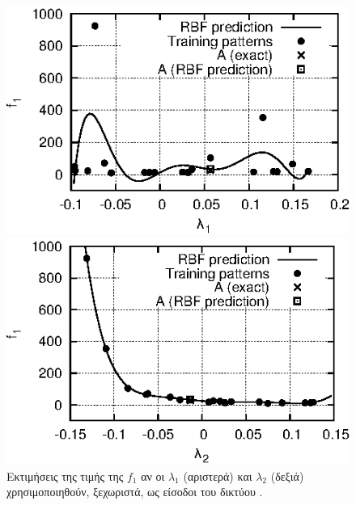 \begin{figure}
\begin{minipage}{0.48\textwidth}
\includegraphics[scale=1.2]{IPE/f1_e1_b.eps}
\end{minipage}
\begin{minipage}{0.48\textwidth}
\includegraphics[scale=1.2]{IPE/f1_e2_b.eps}
\end{minipage}
\caption{ Εκτιμήσεις της τιμής της $f_1$ αν οι $\lambda_1$ (αριστερά) και $\lambda_2$ (δεξιά) χρησιμοποιηθούν, ξεχωριστά, ως είσοδοι του δικτύου .}
\label{fig:f1e1e2}
\end{figure}

